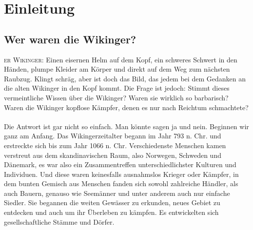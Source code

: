 \documentclass[12pt,a4paper,ngerman,openany]{book}
\newcommand{\flettrine}[2]{\lettrine[lines=2, depth=0, loversize=0.25, nindent=0.69pt, lraise=0.15]{\initfamily{#1}}{#2}}
\newcommand*\initfamily{\usefont{U}{GotIn}{xl}{n}}
\newcommand\blankpage{\null \thispagestyle{empty} \addtocounter{page}{-1} \newpage}
\newcommand{\fchapter}[1]{\chapter{#1}\thispagestyle{chapterstyle}}
\begin{document}

\thispagestyle{empty}
\newpage

\afterpage{\blankpage}
\tableofcontents
\thispagestyle{empty}


\fchapter{Einleitung}

\section{Wer waren die Wikinger?}

\flettrine{D}{er Wikinger:} Einen eisernen Helm auf dem Kopf, ein schweres Schwert in den Händen, plumpe Kleider am Körper und direkt auf dem Weg zum nächsten Raubzug.
Klingt schräg, aber ist doch das Bild, das jedem bei dem Gedanken an die alten Wikinger in den Kopf kommt. Die Frage ist jedoch: Stimmt dieses vermeintliche Wissen über die Wikinger?
Waren sie wirklich so barbarisch? Waren die Wikinger kopflose Kämpfer, denen es nur nach Reichtum schmachtete?\\\\
Die Antwort ist gar nicht so einfach. Man könnte sagen ja und nein. Beginnen wir ganz am Anfang. Das Wikingerzeitalter begann im Jahr 793 n. Chr. und erstreckte sich bis zum Jahr 1066 n. Chr.
Verschiedenste Menschen kamen verstreut aus dem skandinavischen Raum, also Norwegen, Schweden und Dänemark, es war also ein Zusammentreffen unterschiedlichster Kulturen und Individuen.
Und diese waren keinesfalls ausnahmslos Krieger oder Kämpfer, in dem bunten Gemisch aus Menschen fanden sich sowohl zahlreiche Händler, als auch Bauern, genauso wie Seemänner und unter anderem auch nur einfache Siedler.
Sie begannen die weiten Gewässer zu erkunden, neues Gebiet zu entdecken und auch um ihr Überleben zu kämpfen. Es entwickelten sich gesellschaftliche Stämme und Dörfer.
\end{document}
